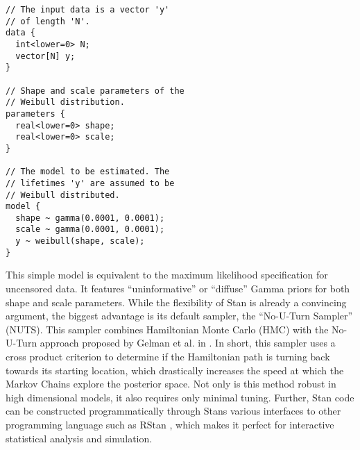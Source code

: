 \begin{verbatim}
// The input data is a vector 'y' 
// of length 'N'.
data {
  int<lower=0> N;
  vector[N] y;
}

// Shape and scale parameters of the
// Weibull distribution.
parameters {
  real<lower=0> shape;
  real<lower=0> scale;
}

// The model to be estimated. The 
// lifetimes 'y' are assumed to be
// Weibull distributed.
model {
  shape ~ gamma(0.0001, 0.0001);
  scale ~ gamma(0.0001, 0.0001);
  y ~ weibull(shape, scale);
}
\end{verbatim}
This simple model is equivalent to the maximum likelihood specification for uncensored data. It features ``uninformative'' or ``diffuse'' Gamma priors for both shape and scale parameters. While the flexibility of Stan is already a convincing argument, the biggest advantage is its default sampler, the ``No-U-Turn Sampler'' (NUTS). This sampler combines Hamiltonian Monte Carlo (HMC) \cite{betancourt1} with the No-U-Turn approach proposed by Gelman et al. in \cite{NUTS}. In short, this sampler uses a cross product criterion to determine if the Hamiltonian path is turning back towards its starting location, which drastically increases the speed at which the Markov Chains explore the posterior space. Not only is this method robust in high dimensional models, it also requires only minimal tuning. Further, Stan code can be constructed programmatically through Stans various interfaces to other programming language such as RStan \cite{rstan}, which makes it perfect for interactive statistical analysis and simulation. 

